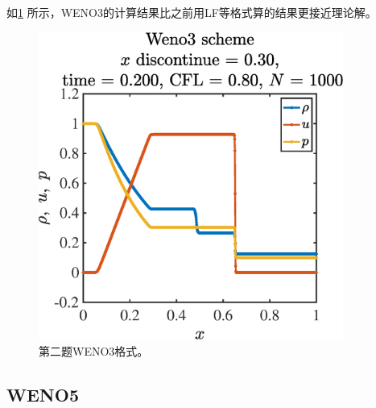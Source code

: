 \documentclass[12pt]{article}
\begin{document}
如\cref{fig:2weno3} 所示，WENO3的计算结果比之前用LF等格式算的结果更接近理论解。


\begin{figure}[htp]
	\centering
	\includegraphics[width=10cm]{2weno3.eps}
	\caption{第二题WENO3格式。}
	\label{fig:2weno3}
\end{figure}

\subsection{WENO5}
\end{document}
